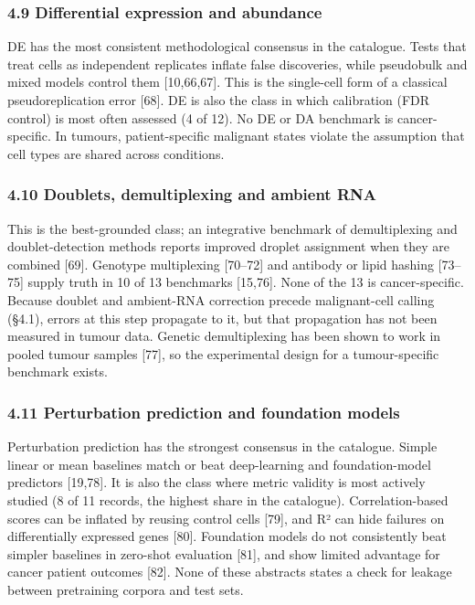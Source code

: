 \documentclass[11pt]{article}
\begin{document}
\subsubsection{4.9 Differential expression and
abundance}\label{differential-expression-and-abundance}

DE has the most consistent methodological consensus in the catalogue.
Tests that treat cells as independent replicates inflate false
discoveries, while pseudobulk and mixed models control them
{[}10,66,67{]}. This is the single-cell form of a classical
pseudoreplication error {[}68{]}. DE is also the class in which
calibration (FDR control) is most often assessed (4 of 12). No DE or DA
benchmark is cancer-specific. In tumours, patient-specific malignant
states violate the assumption that cell types are shared across
conditions.

\subsubsection{4.10 Doublets, demultiplexing and ambient
RNA}\label{doublets-demultiplexing-and-ambient-rna}

This is the best-grounded class; an integrative benchmark of
demultiplexing and doublet-detection methods reports improved droplet
assignment when they are combined {[}69{]}. Genotype multiplexing
{[}70--72{]} and antibody or lipid hashing {[}73--75{]} supply truth in
10 of 13 benchmarks {[}15,76{]}. None of the 13 is cancer-specific.
Because doublet and ambient-RNA correction precede malignant-cell
calling (§4.1), errors at this step propagate to it, but that
propagation has not been measured in tumour data. Genetic demultiplexing
has been shown to work in pooled tumour samples {[}77{]}, so the
experimental design for a tumour-specific benchmark exists.

\subsubsection{4.11 Perturbation prediction and foundation
models}\label{perturbation-prediction-and-foundation-models}

Perturbation prediction has the strongest consensus in the catalogue.
Simple linear or mean baselines match or beat deep-learning and
foundation-model predictors {[}19,78{]}. It is also the class where
metric validity is most actively studied (8 of 11 records, the highest
share in the catalogue). Correlation-based scores can be inflated by
reusing control cells {[}79{]}, and R² can hide failures on
differentially expressed genes {[}80{]}. Foundation models do not
consistently beat simpler baselines in zero-shot evaluation {[}81{]},
and show limited advantage for cancer patient outcomes {[}82{]}. None of
these abstracts states a check for leakage between pretraining corpora
and test sets.
\end{document}
